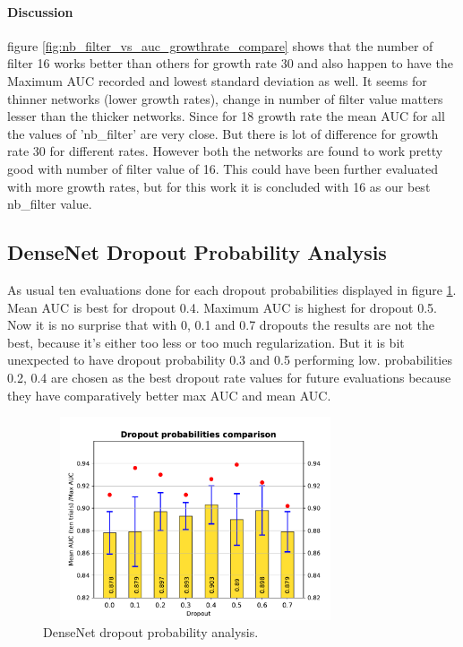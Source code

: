 \paragraph{Discussion\\}
figure \ref{fig:nb_filter_vs_auc_growthrate_compare} shows that the number of filter 16 works better than others for growth rate 30 and also happen to have the Maximum AUC recorded and lowest standard deviation as well. 
It seems for thinner networks (lower growth rates), change in number of filter value matters lesser than the thicker networks. 
Since for 18 growth rate the mean AUC for all the values of 'nb\_filter' are very close. But there is lot of difference for growth rate 30 for different rates.
However both the networks are found to work pretty good with number of filter value of 16. This could have been further evaluated with more growth rates, but for this work it is concluded with 16 as our best nb\_filter value.

\subsection{DenseNet Dropout Probability Analysis}
As usual ten evaluations done for each dropout probabilities displayed in figure \ref{fig:auc_vs_densenet_dropout}. Mean AUC is best for dropout 0.4. Maximum AUC is highest for dropout 0.5.
Now it is no surprise that with 0, 0.1 and 0.7 dropouts the results are not the best, because it's either too less or too much regularization. But it is bit unexpected to have dropout probability 0.3 and 0.5 performing low. 
probabilities 0.2, 0.4 are chosen as the best dropout rate values for future evaluations because they have comparatively better max AUC and mean AUC.

\begin{figure}[ht]
\centering
\includegraphics[width=9cm,height=6cm]{images/densenet/siamese/densenet_siamese_dropout}
\caption{DenseNet dropout probability analysis.}
\label{fig:auc_vs_densenet_dropout}
\end{figure}

